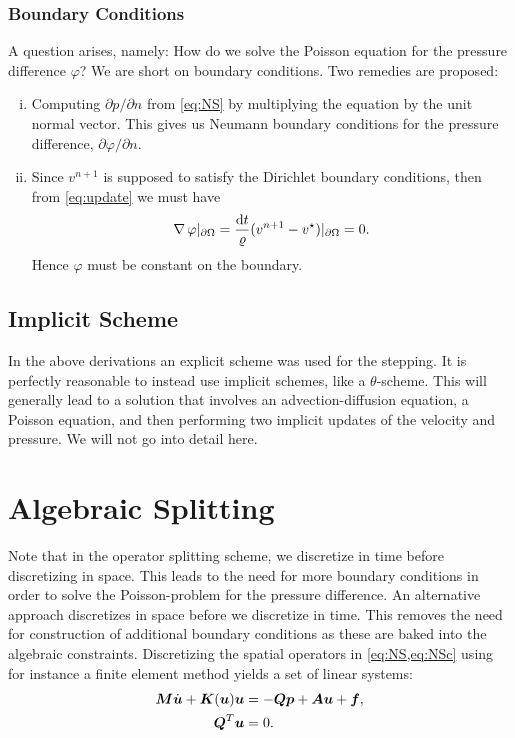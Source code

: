 \subsubsection{Boundary Conditions}
\label{par:boundary_conditions}

A question arises, namely: How do we solve the Poisson equation for the
pressure difference \( \varphi \)? We are short on boundary conditions. Two
remedies are proposed:
\begin{enumerate}[(i)]
    \item Computing \( \partial p / \partial n\) from \cref{eq:NS} by
        multiplying the equation by the unit normal vector. This gives us
        Neumann boundary conditions for the pressure difference, \( \partial
        \varphi / \partial n \).
    \item Since \( v^{n+1} \) is supposed to satisfy the Dirichlet boundary
        conditions, then from \cref{eq:update} we must have
        \begin{equation}
            \operatorname{\mathop{}\!\nabla} \varphi |_{\partial \Omega} = \frac{\mathrm{d} t}{\varrho} (v^{n+1} - v^\star)|_{\partial\Omega} = 0.
        \end{equation}
        Hence \( \varphi \) must be constant on the boundary.
\end{enumerate}

\subsection{Implicit Scheme}
\label{par:implicit_scheme}

In the above derivations an explicit scheme was used for the stepping. It is
perfectly reasonable to instead use implicit schemes, like a \( \theta
\)-scheme. This will generally lead to a solution that involves an
advection-diffusion equation, a Poisson equation, and then performing two
implicit updates of the velocity and pressure. We will not go into detail here.

\section{Algebraic Splitting}
\label{sec:algebraic_splitting}
 
Note that in the operator splitting scheme, we discretize in time before
discretizing in space. This leads to the need for more boundary conditions in
order to solve the Poisson-problem for the pressure difference. An alternative
approach discretizes in space before we discretize in time. This removes the
need for construction of additional boundary conditions as these are baked into
the algebraic constraints. Discretizing the spatial operators in
\cref{eq:NS,eq:NSc} using for instance a finite element method yields a set of
linear systems:
\begin{align}
    \boldsymbol{M}\dot{\boldsymbol{u}} + \boldsymbol{K}(\boldsymbol{u}) \boldsymbol{u} &= - \boldsymbol{Q}\boldsymbol{p} + \boldsymbol{A}\boldsymbol{u} + \boldsymbol{f}, \\
    \boldsymbol{Q}^T\boldsymbol{u} &= 0.
\end{align}

